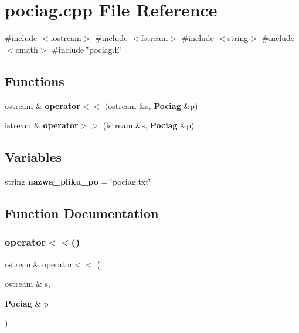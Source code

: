 \section{pociag.\+cpp File Reference}
\label{pociag_8cpp}
{\ttfamily \#include $<$iostream$>$}\newline
{\ttfamily \#include $<$fstream$>$}\newline
{\ttfamily \#include $<$string$>$}\newline
{\ttfamily \#include $<$cmath$>$}\newline
{\ttfamily \#include \char`\"{}pociag.\+h\char`\"{}}\newline
\subsection*{Functions}
\begin{DoxyCompactItemize}
\item 
ostream \& \textbf{ operator$<$$<$} (ostream \&s, \textbf{ Pociag} \&p)
\item 
istream \& \textbf{ operator$>$$>$} (istream \&s, \textbf{ Pociag} \&p)
\end{DoxyCompactItemize}
\subsection*{Variables}
\begin{DoxyCompactItemize}
\item 
string \textbf{ nazwa\+\_\+pliku\+\_\+po} = \char`\"{}pociag.\+txt\char`\"{}
\end{DoxyCompactItemize}


\subsection{Function Documentation}
\mbox{\label{pociag_8cpp_aa69694c17cdb3e184cc54938668f705c}} 
\subsubsection{operator$<$$<$()}
{\footnotesize\ttfamily ostream\& operator$<$$<$ (\begin{DoxyParamCaption}\item[{ostream \&}]{s,  }\item[{\textbf{ Pociag} \&}]{p }\end{DoxyParamCaption})}

